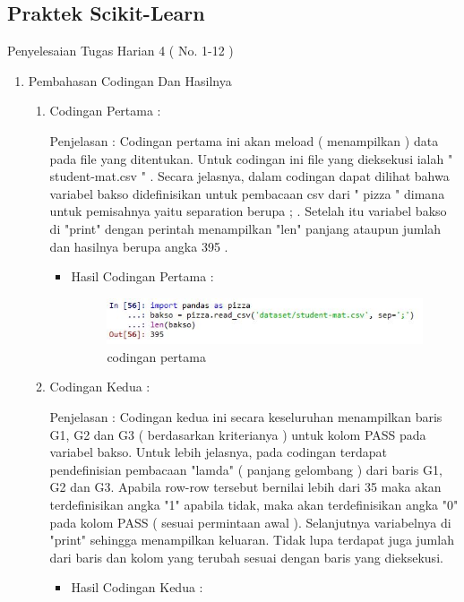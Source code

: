 \subsection{Praktek Scikit-Learn}
Penyelesaian Tugas Harian 4 ( No. 1-12 )
\begin{enumerate}
\item Pembahasan Codingan Dan Hasilnya
\begin{enumerate}
\item Codingan Pertama :
\par Penjelasan : Codingan pertama ini akan meload ( menampilkan ) data pada file yang ditentukan. Untuk codingan ini file yang dieksekusi ialah " student-mat.csv " . Secara jelasnya, dalam codingan dapat dilihat bahwa variabel bakso didefinisikan untuk pembacaan csv dari " pizza " dimana untuk pemisahnya yaitu separation berupa ; . Setelah itu variabel bakso di "print" dengan perintah menampilkan "len" panjang ataupun jumlah dan hasilnya berupa angka 395 . 
\par
\begin{itemize}
\par
\item Hasil Codingan Pertama :
\par

\begin{figure}[ht]
\centering
\includegraphics[scale=0.7]{figures/hasil1.jpg}
\caption{codingan pertama}
\label{contoh}
\end{figure}

\par
\end{itemize}
\item Codingan Kedua :
\par Penjelasan : Codingan kedua ini secara keseluruhan menampilkan  baris  G1, G2 dan G3 ( berdasarkan kriterianya ) untuk kolom PASS pada variabel bakso. Untuk lebih jelasnya, pada codingan terdapat pendefinisian pembacaan "lamda" ( panjang gelombang ) dari baris G1, G2 dan G3. Apabila row-row tersebut bernilai lebih dari 35 maka akan terdefinisikan angka "1" apabila tidak, maka akan terdefinisikan angka "0" pada kolom PASS ( sesuai permintaan awal ). Selanjutnya variabelnya di "print" sehingga menampilkan keluaran. Tidak lupa terdapat juga jumlah dari baris dan kolom yang terubah sesuai dengan baris yang dieksekusi.
\par 
\begin{itemize}
\par
\item Hasil Codingan Kedua :


\end{itemize}
\end{enumerate}
\end{enumerate}
